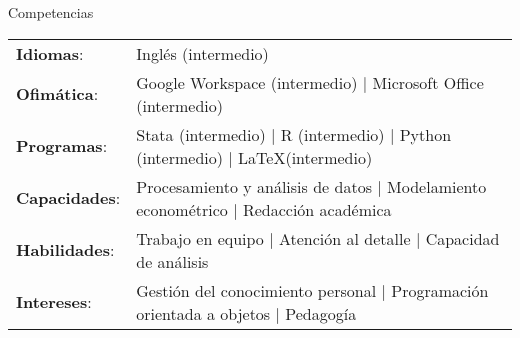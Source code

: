 \documentclass{resume} %
\begin{document}
\begin{rSection}{Competencias}


\begin{table}[!h]
    \begin{tabular}{ll}
        {\bf Idiomas}: & Inglés (intermedio) \\
        {\bf Ofimática}: & Google Workspace (intermedio) $|$ Microsoft Office (intermedio) \\
        {\bf Programas}: & Stata (intermedio) $|$ R (intermedio) $|$ Python (intermedio) $|$ \LaTeX (intermedio) \\
        {\bf Capacidades}: & Procesamiento y análisis de datos $|$ Modelamiento econométrico $|$ Redacción académica \\
        {\bf Habilidades}: & Trabajo en equipo $|$ Atención al detalle $|$ Capacidad de análisis \\
        {\bf Intereses}: & Gestión del conocimiento personal $|$ Programación orientada a objetos $|$ Pedagogía
    \end{tabular}
\end{table}

\end{rSection}









\end{document}
